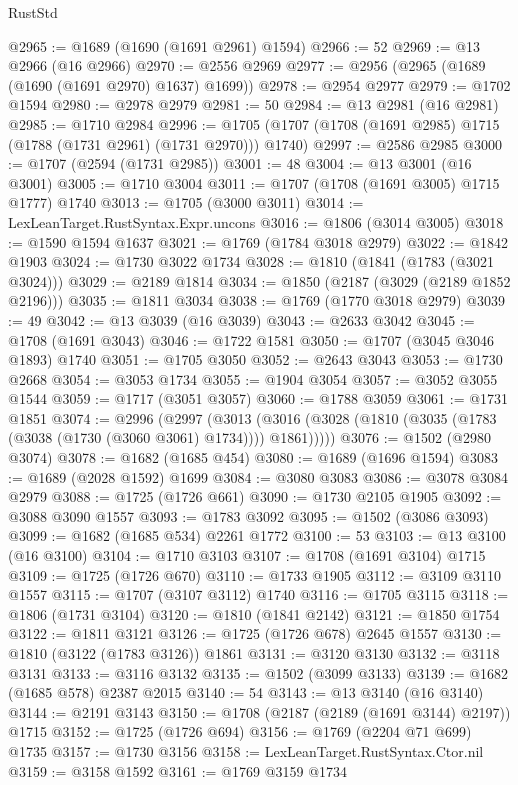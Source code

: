 \begin{lexlean}{RustStd}
\begin{coremodule}
@2965 := @1689 (@1690 (@1691 @2961) @1594)
@2966 := 52
@2969 := @13 @2966 (@16 @2966)
@2970 := @2556 @2969
@2977 := @2956 (@2965 (@1689 (@1690 (@1691 @2970) @1637) @1699))
@2978 := @2954 @2977
@2979 := @1702 @1594
@2980 := @2978 @2979
@2981 := 50
@2984 := @13 @2981 (@16 @2981)
@2985 := @1710 @2984
@2996 := @1705 (@1707 (@1708 (@1691 @2985) @1715 (@1788 (@1731 @2961) (@1731 @2970))) @1740)
@2997 := @2586 @2985
@3000 := @1707 (@2594 (@1731 @2985))
@3001 := 48
@3004 := @13 @3001 (@16 @3001)
@3005 := @1710 @3004
@3011 := @1707 (@1708 (@1691 @3005) @1715 @1777) @1740
@3013 := @1705 (@3000 @3011)
@3014 := LexLeanTarget.RustSyntax.Expr.uncons
@3016 := @1806 (@3014 @3005)
@3018 := @1590 @1594 @1637
@3021 := @1769 (@1784 @3018 @2979)
@3022 := @1842 @1903
@3024 := @1730 @3022 @1734
@3028 := @1810 (@1841 (@1783 (@3021 @3024)))
@3029 := @2189 @1814
@3034 := @1850 (@2187 (@3029 (@2189 @1852 @2196)))
@3035 := @1811 @3034
@3038 := @1769 (@1770 @3018 @2979)
@3039 := 49
@3042 := @13 @3039 (@16 @3039)
@3043 := @2633 @3042
@3045 := @1708 (@1691 @3043)
@3046 := @1722 @1581
@3050 := @1707 (@3045 @3046 @1893) @1740
@3051 := @1705 @3050
@3052 := @2643 @3043
@3053 := @1730 @2668
@3054 := @3053 @1734
@3055 := @1904 @3054
@3057 := @3052 @3055 @1544
@3059 := @1717 (@3051 @3057)
@3060 := @1788 @3059
@3061 := @1731 @1851
@3074 := @2996
    (@2997
      (@3013 (@3016 (@3028 (@1810 (@3035 (@1783 (@3038 (@1730 (@3060 @3061) @1734)))) @1861)))))
@3076 := @1502 (@2980 @3074)
@3078 := @1682 (@1685 @454)
@3080 := @1689 (@1696 @1594)
@3083 := @1689 (@2028 @1592) @1699
@3084 := @3080 @3083
@3086 := @3078 @3084 @2979
@3088 := @1725 (@1726 @661)
@3090 := @1730 @2105 @1905
@3092 := @3088 @3090 @1557
@3093 := @1783 @3092
@3095 := @1502 (@3086 @3093)
@3099 := @1682 (@1685 @534) @2261 @1772
@3100 := 53
@3103 := @13 @3100 (@16 @3100)
@3104 := @1710 @3103
@3107 := @1708 (@1691 @3104) @1715
@3109 := @1725 (@1726 @670)
@3110 := @1733 @1905
@3112 := @3109 @3110 @1557
@3115 := @1707 (@3107 @3112) @1740
@3116 := @1705 @3115
@3118 := @1806 (@1731 @3104)
@3120 := @1810 (@1841 @2142)
@3121 := @1850 @1754
@3122 := @1811 @3121
@3126 := @1725 (@1726 @678) @2645 @1557
@3130 := @1810 (@3122 (@1783 @3126)) @1861
@3131 := @3120 @3130
@3132 := @3118 @3131
@3133 := @3116 @3132
@3135 := @1502 (@3099 @3133)
@3139 := @1682 (@1685 @578) @2387 @2015
@3140 := 54
@3143 := @13 @3140 (@16 @3140)
@3144 := @2191 @3143
@3150 := @1708 (@2187 (@2189 (@1691 @3144) @2197)) @1715
@3152 := @1725 (@1726 @694)
@3156 := @1769 (@2204 @71 @699) @1735
@3157 := @1730 @3156
@3158 := LexLeanTarget.RustSyntax.Ctor.nil
@3159 := @3158 @1592
@3161 := @1769 @3159 @1734

\end{coremodule}
\end{lexlean}
